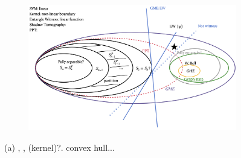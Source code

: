 \documentclass[
10pt,
aps,
pra,
linenumbers,
floatfix,
]{revtex4-2}
\theoremstyle{plain}
\theoremstyle{definition}
\begin{document}
\begin{figure}[!ht]
	\centering
	\begin{subfigure}{0.6\textwidth}
		\centering
		\includegraphics[width=.9\linewidth]{diagram.png}
	\end{subfigure}
	\caption{(a) , ,  (kernel)?. convex hull... }
	\label{fig:entangle}
\end{figure}
\end{document}
